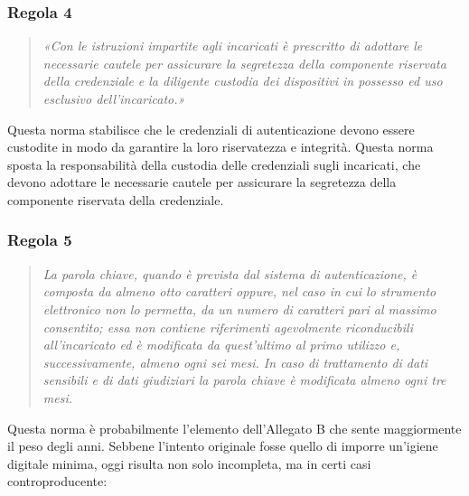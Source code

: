 \subsubsection*{Regola 4}
\begin{quote}
    \textit{«Con le istruzioni impartite agli incaricati è prescritto di adottare le necessarie cautele per assicurare la segretezza della componente riservata della credenziale e la diligente custodia dei dispositivi in possesso ed uso esclusivo dell'incaricato.»}
\end{quote}
Questa norma stabilisce che le credenziali di autenticazione devono essere custodite in modo da garantire la loro riservatezza e integrità. Questa norma sposta la responsabilità della custodia delle credenziali sugli incaricati, che devono adottare le necessarie cautele per assicurare la segretezza della componente riservata della credenziale. 
\subsubsection*{Regola 5}
\begin{quote}
    \textit{La parola chiave, quando è prevista dal sistema di autenticazione, è composta da almeno otto caratteri oppure, nel caso in cui lo strumento elettronico non lo permetta, da un numero di caratteri pari al massimo consentito; essa non contiene riferimenti agevolmente riconducibili all'incaricato ed è modificata da quest'ultimo al primo utilizzo e, successivamente, almeno ogni sei mesi. In caso di trattamento di dati sensibili e di dati giudiziari la parola chiave è modificata almeno ogni tre mesi.}
\end{quote}
Questa norma è probabilmente l'elemento dell'Allegato B che sente maggiormente il peso degli anni. Sebbene l'intento originale fosse quello di imporre un'igiene digitale minima, oggi risulta non solo incompleta, ma in certi casi controproducente:

